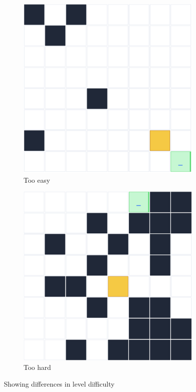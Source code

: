 \documentclass{article}
\begin{document}
\begin{figure}
\centering
\begin{subfigure}{.5\textwidth}
  \centering
\includegraphics[width=0.8\linewidth]{level-easy.png}
\caption{Too easy}
\label{fig:level-easy}
\end{subfigure}%
\begin{subfigure}{.5\textwidth}
  \centering
\includegraphics[width=0.8\linewidth]{level-hard.png}
\caption{Too hard}
\label{fig:level-hard}
\end{subfigure}
\caption{Showing differences in level difficulty}
\label{fig:test}
\end{figure}
\end{document}
